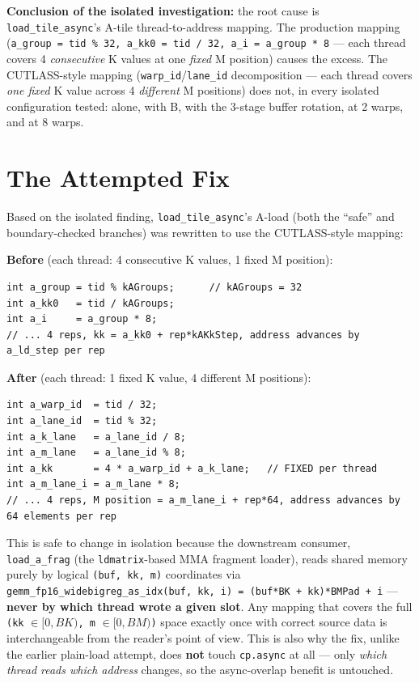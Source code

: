 \documentclass[11pt]{article}
\begin{document}
\textbf{Conclusion of the isolated investigation:} the root cause is \texttt{load\_tile\_async}'s A-tile thread-to-address mapping. The production mapping (\texttt{a\_group = tid \% 32, a\_kk0 = tid / 32, a\_i = a\_group * 8} --- each thread covers 4 \emph{consecutive} K values at one \emph{fixed} M position) causes the excess. The CUTLASS-style mapping (\texttt{warp\_id}/\texttt{lane\_id} decomposition --- each thread covers \emph{one fixed} K value across 4 \emph{different} M positions) does not, in every isolated configuration tested: alone, with B, with the 3-stage buffer rotation, at 2 warps, and at 8 warps.

\section{The Attempted Fix}

Based on the isolated finding, \texttt{load\_tile\_async}'s A-load (both the ``safe'' and boundary-checked branches) was rewritten to use the CUTLASS-style mapping:

\textbf{Before} (each thread: 4 consecutive K values, 1 fixed M position):
\begin{lstlisting}
int a_group = tid % kAGroups;      // kAGroups = 32
int a_kk0   = tid / kAGroups;
int a_i     = a_group * 8;
// ... 4 reps, kk = a_kk0 + rep*kAKkStep, address advances by a_ld_step per rep
\end{lstlisting}

\textbf{After} (each thread: 1 fixed K value, 4 different M positions):
\begin{lstlisting}
int a_warp_id  = tid / 32;
int a_lane_id  = tid % 32;
int a_k_lane   = a_lane_id / 8;
int a_m_lane   = a_lane_id % 8;
int a_kk       = 4 * a_warp_id + a_k_lane;   // FIXED per thread
int a_m_lane_i = a_m_lane * 8;
// ... 4 reps, M position = a_m_lane_i + rep*64, address advances by 64 elements per rep
\end{lstlisting}

This is safe to change in isolation because the downstream consumer, \texttt{load\_a\_frag} (the \texttt{ldmatrix}-based MMA fragment loader), reads shared memory purely by logical \texttt{(buf, kk, m)} coordinates via \texttt{gemm\_fp16\_widebigreg\_as\_idx(buf, kk, i) = (buf*BK + kk)*BMPad + i} --- \textbf{never by which thread wrote a given slot}. Any mapping that covers the full \texttt{(kk} $\in [0, BK)$\texttt{, m} $\in [0, BM)$\texttt{)} space exactly once with correct source data is interchangeable from the reader's point of view. This is also why the fix, unlike the earlier plain-load attempt, does \textbf{not} touch \texttt{cp.async} at all --- only \emph{which thread reads which address} changes, so the async-overlap benefit is untouched.
\end{document}
